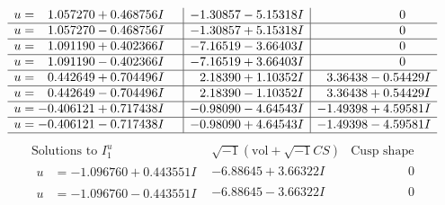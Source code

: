 \documentclass[1p]{elsarticle_modified}
\theoremstyle{definition}
\newcommand{\I}{\sqrt{-1}}
\begin{document}
$$\begin{array}{c|c|c}
\begin{aligned}
u &= \phantom{-}1.057270 + 0.468756 I\end{aligned}
 & -1.30857 - 5.15318 I & \phantom{-0.000000 } 0 \\ \hline\begin{aligned}
u &= \phantom{-}1.057270 - 0.468756 I\end{aligned}
 & -1.30857 + 5.15318 I & \phantom{-0.000000 } 0 \\ \hline\begin{aligned}
u &= \phantom{-}1.091190 + 0.402366 I\end{aligned}
 & -7.16519 - 3.66403 I & \phantom{-0.000000 } 0 \\ \hline\begin{aligned}
u &= \phantom{-}1.091190 - 0.402366 I\end{aligned}
 & -7.16519 + 3.66403 I & \phantom{-0.000000 } 0 \\ \hline\begin{aligned}
u &= \phantom{-}0.442649 + 0.704496 I\end{aligned}
 & \phantom{-}2.18390 + 1.10352 I & \phantom{-}3.36438 - 0.54429 I \\ \hline\begin{aligned}
u &= \phantom{-}0.442649 - 0.704496 I\end{aligned}
 & \phantom{-}2.18390 - 1.10352 I & \phantom{-}3.36438 + 0.54429 I \\ \hline\begin{aligned}
u &= -0.406121 + 0.717438 I\end{aligned}
 & -0.98090 - 4.64543 I & -1.49398 + 4.59581 I \\ \hline\begin{aligned}
u &= -0.406121 - 0.717438 I\end{aligned}
 & -0.98090 + 4.64543 I & -1.49398 - 4.59581 I\\
 \hline 
 \end{array}$$\newpage$$\begin{array}{c|c|c}  
\text{Solutions to }I^u_{1}& \I (\text{vol} + \sqrt{-1}CS) & \text{Cusp shape}\\
 \hline 
\begin{aligned}
u &= -1.096760 + 0.443551 I\end{aligned}
 & -6.88645 + 3.66322 I & \phantom{-0.000000 } 0 \\ \hline\begin{aligned}
u &= -1.096760 - 0.443551 I\end{aligned}
 & -6.88645 - 3.66322 I & \phantom{-0.000000 } 0 \\ \hline\begin{aligned}

\end{aligned}
\end{array}$$
\end{document}
